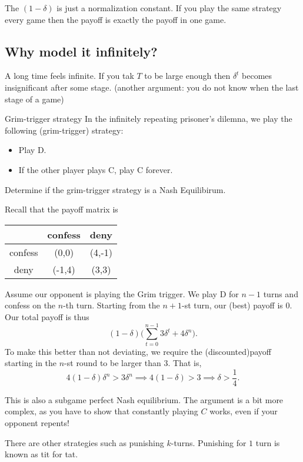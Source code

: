 \begin{remark}
    The $(1-\delta)$ is just a normalization constant. If you play the same strategy every game then the payoff is exactly the payoff in one game.
\end{remark}

\subsection*{Why model it infinitely?}
A long time feels infinite. If you tak $T$ to be large enough then $\delta^t$ becomes insignificant after some stage. (another argument: you do not know when the last stage of a game)


\begin{aexample}{Grim-trigger strategy}{}
    In the infinitely repeating prisoner's dilemna, we play the following (grim-trigger) strategy:\begin{itemize}
        \item Play D. 
        \item If the other player plays C, play C forever. 
    \end{itemize}
    Determine if the grim-trigger strategy is a Nash Equilibirum.
\end{aexample}
Recall that the payoff matrix is
\begin{center}
    \begin{tabular}{|c|c c|}
        \hline & confess & deny \\
        \hline 
        confess & (0,0) & (4,-1)\\
        \hline
        deny & (-1,4) & (3,3)\\\hline
    \end{tabular}
\end{center}

Assume our opponent is playing the Grim trigger. We play D for $n-1$ turns and confess on the $n$-th turn. Starting from the $n+1$-st turn, our (best) payoff is $0$.
Our total payoff is thus \[
(1-\delta)\Big(\sum_{t=0}^{n-1}3\delta^t + 4\delta^{n}\Big).
\]
To make this better than not deviating, we require the (discounted)payoff starting in the $n$-st round to be larger than 3. That is, \[
4(1-\delta)\delta^{n} > 3\delta^n \implies 4(1-\delta)> 3 \implies \delta >\frac{1}{4}.
\]
\begin{remark}
    This is also a subgame perfect Nash equilibrium. The argument is a bit more complex, as you have to show that constantly playing $C$ works, even if your opponent repents!
\end{remark}
\begin{remark}
    There are other strategies such as punishing $k$-turns. Punishing for $1$ turn is known as tit for tat.
\end{remark}

